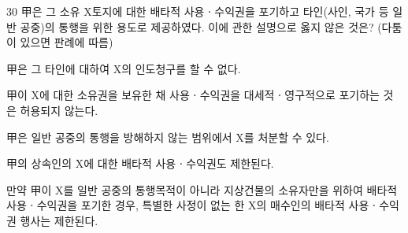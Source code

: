 \begin{question}{30}
甲은 그 소유 X토지에 대한 배타적 사용ㆍ수익권을 포기하고 타인(사인, 국가 등 일반 공중)의 통행을 위한 용도로 제공하였다. 이에 관한 설명으로 옳지 않은 것은? (다툼이 있으면 판례에 따름)
\begin{choices}
  \item 甲은 그 타인에 대하여 X의 인도청구를 할 수 없다.
  \item 甲이 X에 대한 소유권을 보유한 채 사용ㆍ수익권을 대세적ㆍ영구적으로 포기하는 것은 허용되지 않는다.
  \item 甲은 일반 공중의 통행을 방해하지 않는 범위에서 X를 처분할 수 있다.
  \item 甲의 상속인의 X에 대한 배타적 사용ㆍ수익권도 제한된다.
  \item 만약 甲이 X를 일반 공중의 통행목적이 아니라 지상건물의 소유자만을 위하여 배타적 사용ㆍ수익권을 포기한 경우, 특별한 사정이 없는 한 X의 매수인의 배타적 사용ㆍ수익권 행사는 제한된다.
\end{choices}
\end{question}
